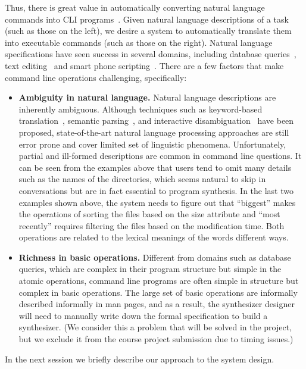 Thus, there is great value in automatically converting natural language commands into CLI programs~\cite{Pedersen-Report,zoltan1991get,Manaris:1994:DNL:198125.198137}.
Given natural language descriptions of a task (such as those on the left), we desire a system to automatically translate them into executable commands (such as those on the right).
Natural language specifications have seen success in several domains, including database queries~\cite{DBLP:journals/pvldb/LiJ14, DBLP:conf/sigmod/GulwaniM14}, text editing~\cite{DBLP:journals/corr/DesaiGHJKMRR15} and smart phone scripting~\cite{DBLP:conf/mobisys/LeGS13}.
There are a few factors that make command line operations challenging, specifically:
\begin{itemize}
\item \textbf{Ambiguity in natural language.} Natural language descriptions are inherently ambiguous. Although techniques such as keyword-based translation~\cite{DBLP:conf/sigmod/GulwaniM14}, semantic parsing~\citep{Zettlemoyer05learningto}, and interactive disambiguation~\cite{DBLP:journals/pvldb/LiJ14} have been proposed, state-of-the-art natural language processing approaches are still error prone and cover limited set of linguistic phenomena.
Unfortunately, partial and ill-formed descriptions are common in command line questions. It can be seen from the examples above that users tend to omit many details such as the names of the directories, which seems natural to skip in conversations but are in fact essential to program synthesis. In the last two examples shown above, the system needs to figure out that ``biggest'' makes the operations of sorting the files based on the size attribute and ``most recently'' requires filtering the files based on the modification time. Both operations are related to the lexical meanings of the words different ways.

\item \textbf{Richness in basic operations.} Different from domains such as database queries, which are complex in their program structure but simple in the atomic operations, command line programs are often simple in structure but complex in basic operations. The large set of basic operations are informally described informally in man pages, and as a result, the synthesizer designer will need to manually write down the formal specification to build a synthesizer. (We consider this a problem that will be solved in the project, but we exclude it from the course project submission due to timing issues.)
\end{itemize}

In the next session we briefly describe our approach to the system design.
